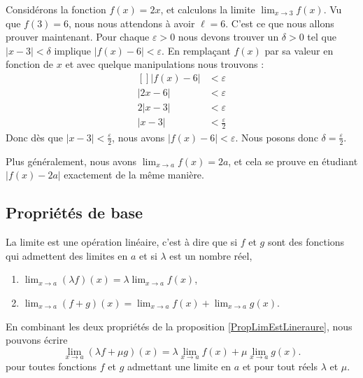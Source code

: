 \begin{example}
	Considérons la fonction $f(x)=2x$, et calculons la limite $\lim_{x\to 3} f(x)$. Vu que $f(3)=6$, nous nous attendons à avoir $\ell=6$. C'est ce que nous allons prouver maintenant. Pour chaque $\varepsilon>0$ nous devons trouver un $\delta>0$ tel que $| x-3 |<\delta$ implique $| f(x)-6 |<\varepsilon$. En remplaçant $f(x)$ par sa valeur en fonction de $x$ et avec quelque manipulations nous trouvons :
	\begin{equation}
		\begin{aligned}[]
			| f(x)-6 |&<\varepsilon\\
			| 2x-6 |&<\varepsilon\\
			2| x-3 |&<\varepsilon\\
			| x-3 |&<\frac{ \varepsilon }{2}
		\end{aligned}
	\end{equation}
	Donc dès que $| x-3 |<\frac{ \varepsilon }{2}$, nous avons $| f(x)-6 |<\varepsilon$. Nous posons donc $\delta=\frac{ \varepsilon }{2}$.

	Plus généralement, nous avons $\lim_{x\to a} f(x)=2a$, et cela se prouve en étudiant $| f(x)-2a |$ exactement de la même manière.
\end{example}

\subsection{Propriétés de base}

\begin{proposition}	\label{PropLimEstLineraure}
	La limite est une opération linéaire, c'est à dire que si $f$ et $g$ sont des fonctions qui admettent des limites en $a$ et si $\lambda$ est un nombre réel,
	\begin{enumerate}

		\item
			$\lim_{x\to a} (\lambda f)(x)=\lambda\lim_{x\to a} f(x)$,
		\item
			$\lim_{x\to a} (f+g)(x)=\lim_{x\to a} f(x)+\lim_{x\to a} g(x)$.
	\end{enumerate}
\end{proposition}
En combinant les deux propriétés de la proposition \ref{PropLimEstLineraure}, nous pouvons écrire
\begin{equation}
	\lim_{x\to a} (\lambda f+\mu g)(x)=\lambda\lim_{x\to a} f(x)+\mu\lim_{x\to a} g(x).
\end{equation}
pour toutes fonctions $f$ et $g$ admettant une limite en $a$ et pour tout réels $\lambda$ et $\mu$.


